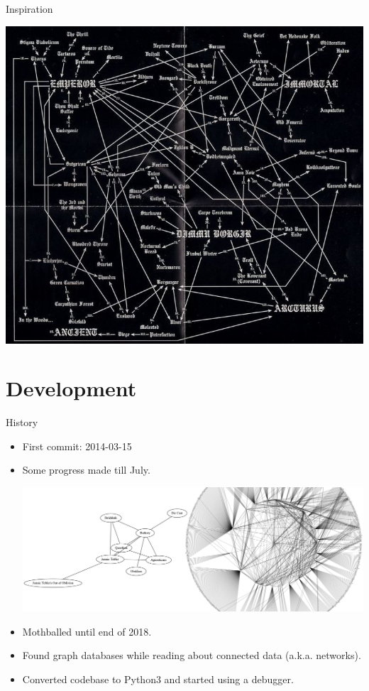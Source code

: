 \documentclass{beamer}
\begin{document}
    \begin{frame}{Inspiration}
      \begin{center}
        \includegraphics[scale=2.3]{true_kings_diagram}
      \end{center}
    \end{frame}

\section{Development}

    \begin{frame}{History}

      \begin{itemize}

        \item<1-> First commit: 2014-03-15
        \item<1-> Some progress made till July.
          \begin{center}
            \includegraphics[scale=.6]{bandsGraphCombined}
          \end{center}
        \item<2-> Mothballed until end of 2018.
        \item<2-> Found graph databases while reading about connected data
          (a.k.a. networks).
        \item<2-> Converted codebase to Python3 and started using a debugger.
      \end{itemize}

    \end{frame}
\end{document}
